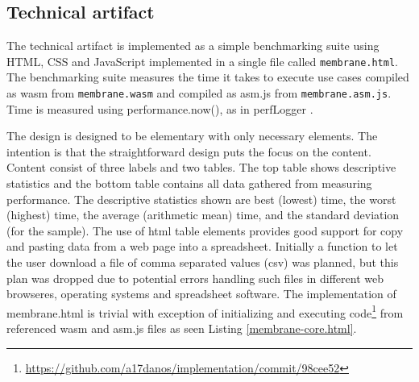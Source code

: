 
\subsection{Technical artifact}


The technical artifact is implemented as a simple benchmarking suite using HTML, CSS and JavaScript implemented in a single file called \texttt{membrane.html}. The benchmarking suite measures the time it takes to execute use cases compiled as wasm from \texttt{membrane.wasm} and compiled as asm.js from \texttt{membrane.asm.js}. Time is measured using performance.now(), as in perfLogger \parencite{Barker2012}. 


The design is designed to be elementary with only necessary elements. The intention is that the straightforward design puts the focus on the content. Content consist of three labels and two tables. The top table shows descriptive statistics and the bottom table contains all data gathered from measuring performance. The descriptive statistics shown are best (lowest) time, the worst (highest) time, the average (arithmetic mean) time, and the standard deviation (for the sample). The use of html table elements provides good support for copy and pasting data from a web page into a spreadsheet. Initially a function to let the user download a file of comma separated values (csv) was planned, but this plan was dropped due to potential errors handling such files in different web browseres, operating systems and spreadsheet software. The implementation of membrane.html is trivial with exception of initializing and executing code\footnote{\url{https://github.com/a17danos/implementation/commit/98cee52}} from referenced wasm and asm.js files as seen Listing \ref{membrane-core.html}.




